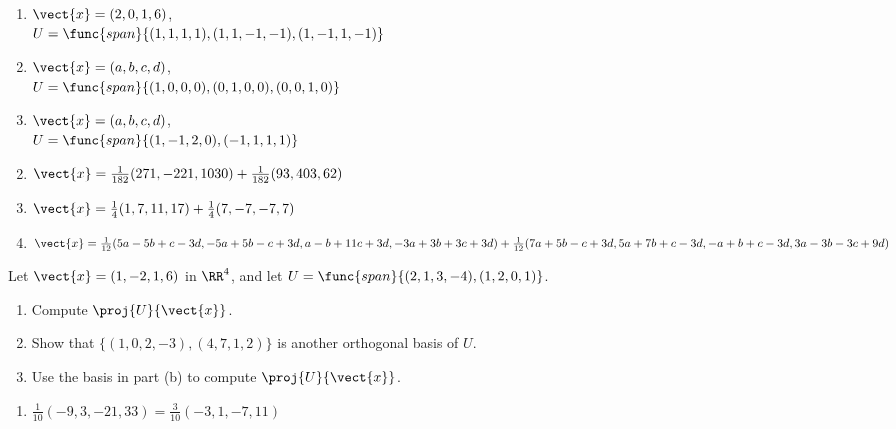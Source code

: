 \begin{multicols}{2}
\begin{ex}
\begin{enumerate}[label={\alph*.}, leftmargin=1em]
\item $\vect{x} = (2, 0, 1, 6)$, \\ \hspace*{-1em}$U = \func{span}\{(1, 1, 1, 1), (1, 1, -1, -1), (1, -1, 1, -1)\}$

\item $\vect{x} = (a, b, c, d)$, \\ $U = \func{span}\{(1, 0, 0, 0), (0, 1, 0, 0), (0, 0, 1, 0)\}$

\item $\vect{x} = (a, b, c, d)$, \\ $U = \func{span}\{(1, -1, 2, 0), (-1, 1, 1, 1)\}$

\end{enumerate}
\begin{sol}
\begin{enumerate}[label={\alph*.}]
	
\setcounter{enumi}{1}
\item $\vect{x} = \frac{1}{182}(271,-221,1030)  + \frac{1}{182}(93,403,62)$

\setcounter{enumi}{3}
\item $\vect{x}= \frac{1}{4}(1, 7, 11, 17) + \frac{1}{4}(7, -7, -7, 7)$

\setcounter{enumi}{5}
\item $\vect{x} = \frac{1}{12}(5a - 5b + c - 3d, -5a + 5b - c + 3d, a - b + 11c + 3d, -3a + 3b + 3c + 3d) + \frac{1}{12}(7a + 5b - c + 3d, 5a + 7b + c - 3d, -a + b + c -3d, 3a - 3b - 3c + 9d)$

\end{enumerate}
\end{sol}
\end{ex}

\begin{ex}
Let $\vect{x} = (1, -2, 1, 6)$ in $\RR^4$, and let $U = \func{span}\{(2, 1, 3, -4), (1, 2, 0, 1)\}$.


\begin{enumerate}[label={\alph*.}]
\item Compute $\proj{U}{\vect{x}}$.

\item Show that $\{(1, 0, 2, -3), (4, 7, 1, 2)\}$ is another orthogonal basis of $U$.

\item Use the basis in part (b) to compute $\proj{U}{\vect{x}}$.

\end{enumerate}
\begin{sol}
\begin{enumerate}[label={\alph*.}]
\item  $\frac{1}{10}(-9,3,-21,33) = \frac{3}{10}(-3,1,-7,11)$


\end{enumerate}
\end{sol}
\end{ex}
\end{multicols}
